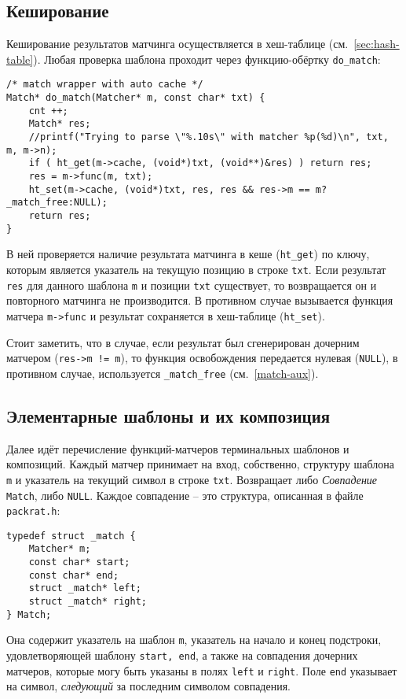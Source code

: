 \documentclass[10pt]{report}
\begin{document}
\subsection{Кеширование}
\label{caching}
Кеширование результатов матчинга осуществляется в хеш-таблице (см.~\ref{sec:hash-table}). 
Любая проверка шаблона проходит через функцию-обёртку {\tt do\_match}:
\begin{lstlisting}[firstnumber=63]
/* match wrapper with auto cache */
Match* do_match(Matcher* m, const char* txt) {
	cnt ++;
	Match* res;
	//printf("Trying to parse \"%.10s\" with matcher %p(%d)\n", txt, m, m->n);
	if ( ht_get(m->cache, (void*)txt, (void**)&res) ) return res;
	res = m->func(m, txt);
	ht_set(m->cache, (void*)txt, res, res && res->m == m?_match_free:NULL);
	return res;
}
\end{lstlisting}
В ней проверяется наличие результата матчинга в кеше ({\tt ht\_get}) по ключу, которым является указатель на текущую позицию в строке {\tt txt}.
Если результат {\tt res} для данного шаблона {\tt m} и позиции {\tt txt} существует, то возвращается он и повторного матчинга не производится.
В противном случае вызывается функция матчера {\tt m->func} и результат сохраняется в хеш-таблице ({\tt ht\_set}). 

Стоит заметить, что в случае, если результат был сгенерирован дочерним матчером ({\tt res->m != m}), то функция освобождения передается нулевая ({\tt NULL}), в противном случае, используется {\tt \_match\_free} (см.~\ref{match-aux}). 

\subsection{Элементарные шаблоны и их композиция}
\label{pattern-matchers}
Далее идёт перечисление функций-матчеров терминальных шаблонов и композиций.
Каждый матчер принимает на вход, собственно, структуру шаблона {\tt m} и указатель на текущий символ в строке {\tt txt}. 
Возвращает либо {\em Совпадение} {\tt Match}, либо {\tt NULL}.
Каждое совпадение -- это структура, описанная в файле {\tt packrat.h}:
\begin{lstlisting}[firstnumber=20]
typedef struct _match {
	Matcher* m;
	const char* start;
	const char* end;
	struct _match* left;
	struct _match* right;
} Match;
\end{lstlisting}
Она содержит указатель на шаблон {\tt m}, указатель на начало и конец подстроки, удовлетворяющей шаблону {\tt start, end}, а также на совпадения дочерних матчеров, которые могу быть указаны в полях {\tt left} и {\tt right}.
Поле {\tt end} указывает на символ, {\em следующий} за последним символом совпадения.
\end{document}
